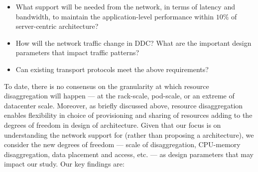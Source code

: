 \begin{itemize}[leftmargin=*]
	\itemsep0em
		\item What support will be needed from the network, in terms of latency and bandwidth, to maintain the application-level performance within $10\%$ of server-centric architecture? 
	\item How will the network traffic change in DDC? What are the important design parameters that impact traffic patterns?
    \item Can existing transport protocols meet the above requirements? 
\end{itemize}

\noindent
To date, there is no consensus on the granularity at which resource disaggregation will happen --- at the rack-scale, pod-scale, or an extreme of datacenter scale. Moreover, as briefly discussed above, resource disaggregation enables flexibility in choice of provisioning and sharing of resources adding to the degrees of freedom in design of \dis architecture. Given that our focus is on understanding the network support for \dis (rather than proposing a \dis architecture), we consider the new degrees of freedom --- scale of disaggregation, CPU-memory disaggregation, data placement and access, etc. --- as design parameters that may impact our study. Our key findings are:

